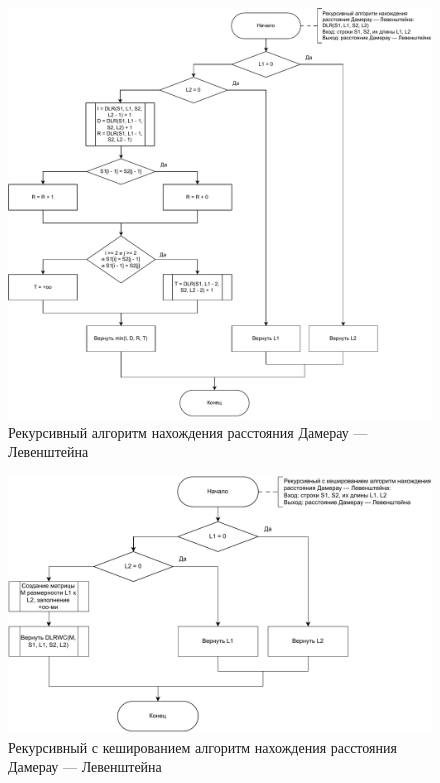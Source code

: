 \begin{figure}[h]
	\centering
	\includegraphics[scale=0.6]{img/dlev_rec.pdf}
	\caption{Рекурсивный алгоритм нахождения расстояния Дамерау --- Левенштейна}
	\label{fig:dlrec}
\end{figure}

\begin{figure}[h]
	\centering
	\includegraphics[scale=0.6]{img/dlev_rwc.pdf}
	\caption{Рекурсивный с кешированием алгоритм нахождения расстояния Дамерау --- Левенштейна}
	\label{fig:dlrwc}
\end{figure}

